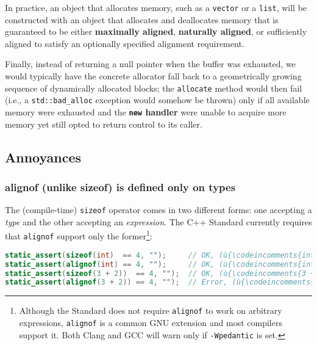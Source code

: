 \noindent In practice, an object that allocates memory, such as a \texttt{vector}
or a \texttt{list}, will be constructed with an object that allocates and
deallocates memory that is guaranteed to be either \textbf{maximally
aligned}, \textbf{naturally aligned}, or sufficiently aligned to satisfy
an optionally specified alignment requirement.

Finally, instead of returning a null pointer when the buffer was
exhausted, we would typically have the concrete allocator fall back to a
geometrically growing sequence of dynamically allocated blocks; the
\texttt{allocate} method would then fail (i.e., a
\texttt{std::bad\_alloc} exception would somehow be thrown) only if all
available memory were exhausted and the \textbf{\texttt{new} handler}
were unable to acquire more memory yet still opted to return control
to its caller.

\subsection[Annoyances]{Annoyances}\label{annoyances-alignof}

\subsubsection[\tt{alignof} (unlike \tt{sizeof}) is defined only on types]{{\SubsubsecCode alignof} (unlike {\SubsubsecCode sizeof}) is defined only on types}\label{alignof-(unlike-sizeof)-is-defined-only-on-types}

The (compile-time) \texttt{sizeof} operator comes in two different
forms: one accepting a \emph{type} and the other accepting an
\emph{expression}. The C++ Standard currently requires that
\texttt{alignof} support only the former{\cprotect\footnote{Although
the Standard does not require \texttt{alignof} to work on arbitrary
expressions, \texttt{alignof} is a common GNU extension and most compilers support
  it. Both Clang and GCC will warn only if \texttt{-Wpedantic} is set.}}:

\begin{lstlisting}[language=C++]
static_assert(sizeof(int)  == 4, "");     // OK, (ù{\codeincomments{int}}ù) is a type.
static_assert(alignof(int) == 4, "");     // OK, (ù{\codeincomments{int}}ù) is a type.
static_assert(sizeof(3 + 2))  == 4, "");  // OK, (ù{\codeincomments{3 + 2}}ù) is an expression.
static_assert(alignof(3 + 2)) == 4, "");  // Error, (ù{\codeincomments{3 + 2}}ù) is not a type.
\end{lstlisting}
    
